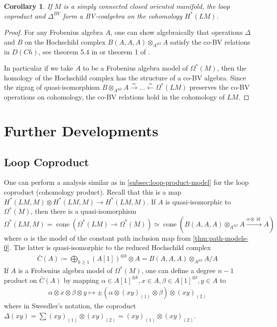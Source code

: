 \documentclass{scrartcl}
\theoremstyle{plain}
\newtheorem{corollary}[theorem]{Corollary}
\theoremstyle{definition}
\DeclareMathOperator{\cone}{cone}
\newcommand{\quiso}{\simeq}
\newcommand{\defeq}{\coloneqq}
\let\xto\xrightarrow
\let\xfrom\xleftarrow
\DeclareMathOperator{\id}{id}
\begin{document}
\begin{corollary}
    If $M$ is a simply connected closed oriented manifold, the loop coproduct and $\Delta^{BV}$ form a BV-coalgebra on the cohomology $H^*(LM)$.
\end{corollary}
\begin{proof}
    For any Frobenius algebra $A$, one can show algebraically that operations $\Delta$ and $B$ on the Hochschild complex $B(A, A, A)\otimes_{A^{\otimes 2}} A$ satisfy the co-BV relations in $D(Ch)$, see theorem 5.4 in \cite{abbaspour2015algebraic} or theorem 1 of \cite{tradler2008bvalg}.

    In particular if we take $A$ to be a Frobenius algebra model of $\Omega^*(M)$, then the homology of the Hochschild complex has the structure of a co-BV algebra. Since the zigzag of quasi-isomorphism $B\otimes_{A^{\otimes 2}}A\xto{\quiso}\dots\xfrom{\quiso} \Omega^*(LM)$ preserves the co-BV operations on cohomology, the co-BV relations hold in the cohomology of $LM$. 
\end{proof}





\section{Further Developments}
\subsection{Loop Coproduct}
One can perform a analysis similar as in \cref{subsec:loop-product-model} for the loop coproduct (cohomology product). Recall that this is a map $H^*(LM, M)\otimes H^*(LM, M)\to H^*(LM, M)$. If $A$ is quasi-isomorphic to $\Omega^*(M)$, then there is a quasi-isomorphism $\Omega^*(LM, M) = \cone(\Omega^*(LM)\to \Omega^*(M))\quiso \cone(B(A, A, A)\otimes_{A^{\otimes 2}} A \xto{\alpha\otimes \id} A)$ where $\alpha$ is the model of the constant path inclusion map from \cref{thm:path-models-0}. The latter is quasi-isomorphic to the reduced Hochschild complex
\begin{align*}
\bar C(A) \defeq \bigoplus_{k\geq 1} (A[1])^{\otimes  k} \otimes A = B(A, A, A)\otimes_{A^{\otimes 2}} A / A
\end{align*}
If $A$ is a Frobenius algebra model of $\Omega^*(M)$, one can define a degree $n-1$ product on $\bar C(A)$ by mapping $\alpha\in A[1]^{\otimes k}, x\in A, \beta\in A[1]^{\otimes l}, y\in A$ to 
\begin{align*}
    \alpha\otimes x\otimes \beta\otimes y  \mapsto  \pm (\alpha \otimes (xy)_{(1)}\otimes\beta)\otimes (xy)_{(2)}
\end{align*}
where in Sweedler's notation, the coproduct $\Delta(xy) = \sum (xy)_{(1)} \otimes (xy)_{(2)} = (xy)_{(1)} \otimes (xy)_{(2)}$.
\end{document}
